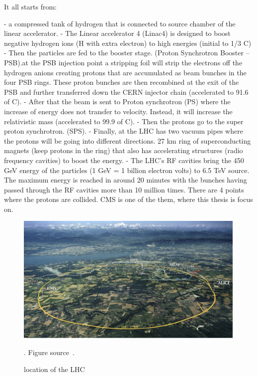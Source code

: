 It all starts from:  

- a compressed tank of hydrogen that is connected to source chamber of the linear accelerator. 
- The Linear accelerator 4 (Linac4) is designed to boost negative hydrogen ions (H with extra electron) to high energies (initial to 1/3 C)
- Then the particles are fed to the booster stage. (Proton Synchrotron Booster – PSB).at the PSB injection point a stripping foil will strip the electrons off the hydrogen anions creating protons that are accumulated as beam bunches in the four PSB rings. 
These proton bunches are then recombined at the exit of the PSB and further transferred down the CERN injector chain (accelerated to 91.6 of C).
- After that the beam is sent to Proton synchrotron (PS) where the increase of energy does not transfer to velocity. Instead, it will increase the relativistic mass (accelerated to 99.9 of C).
- Then the protons go to the super proton synchrotron. (SPS).
- Finally, at the LHC has two vacuum pipes where the protons will be going into different directions. 27 km ring of superconducting magnets (keep protons in the ring) that also has accelerating structures (radio frequency cavities) to boost the energy.  
- The LHC’s RF cavities bring the 450 GeV energy of the particles (1 GeV = 1 billion electron volts) to 6.5 TeV source. The maximum energy is reached in around 20 minutes with the bunches having passed through the RF cavities more than 10 million times. There are 4 points where the protons are collided. CMS is one of the them, where this thesis is focus on. 



\begin{figure}[t!]
\centering
\includegraphics[width=0.99\textwidth]{figures/LHC_location.png}
\caption[location of the LHC]{location of the LHC}. Figure source~\cite{SMtable}.
\label{fig:LHC_location}
\end{figure}

